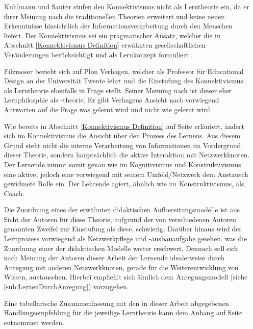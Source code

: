 Kuhlmann und Sauter stufen den Konnektivismus nicht als Lerntheorie ein, da er ihrer Meinung nach die traditionellen Theorien erweitert und keine neuen Erkenntnisse hinsichtlich der Informationsverarbeitung durch den Menschen liefert. Der Konnektivismus sei ein pragmatischer Ansatz, welcher die in Abschnitt \ref{Konnektivismus Definition} erwähnten gesellschaftlichen Veränderungen berücksichtigt und als Lernkonzept formuliert .\cite[S. 50]{Kuhlmann.2008} 

Filzmoser bezieht sich auf Plon Verhagen, welcher als Professor für Educational Design an der Universität Twente lehrt und die Einstufung des Konnektivismus als Lerntheorie ebenfalls in Frage stellt. Seiner Meinung nach ist dieser eher Lernphilosphie als -theorie. Er gibt Verhagens Ansicht nach vorwiegend Antworten auf die Frage was gelernt wird und nicht wie gelernt wird.\cite[S. 26]{Filzmoser.2013}

Wie bereits in Abschnitt \ref{Konnektivismus Definition} auf Seite \pageref{RolleLernender} erläutert, ändert sich im Konnektivismus die Ansicht über den Prozess des Lernens. Aus diesem Grund steht nicht die interne Verarbeitung von Informationen im Vordergrund dieser Theorie, sondern hauptsächlich die aktive Interaktion mit Netzwerkknoten. Der Lernende nimmt somit genau wie im Kognitivismus und Konstruktivismus eine aktive, jedoch eine vorwiegend mit seinem Umfeld/Netzwerk dem Austausch gewidmete Rolle ein. Der Lehrende agiert, ähnlich wie im Konstruktivismus, als Coach. 

Die Zuordnung eines der erwähnten didaktischen Aufbereitungsmodelle ist aus Sicht der Autoren für diese Theorie, aufgrund der von verschiedenen Autoren genannten Zweifel zur Einstufung als diese, schwierig. Darüber hinaus wird der Lernprozess vorwiegend als Netzwerkpflege und -ausbauaufgabe gesehen, was die Zuordnung einer der didaktischen Modelle weiter erschwert. Dennoch soll sich nach Meinung der Autoren dieser Arbeit der Lernende idealerweise durch Anregung mit anderen Netzwerkknoten, gerade für die Weiterentwicklung von Wissen, austauschen. Hierbei empfiehlt sich ähnlich dem Anregungsmodell (siehe \ref{sub:LernenDurchAnregung}) vorzugehen.

Eine tabellarische Zusammenfassung mit den in dieser Arbeit abgegebenen Handlungsempfehlung für die jeweilige Lerntheorie kann dem Anhang auf Seite \pageref{fig:Unterschiede und Handlungsempfehlungen für die Lerntheorien} entnommen werden. 


 
